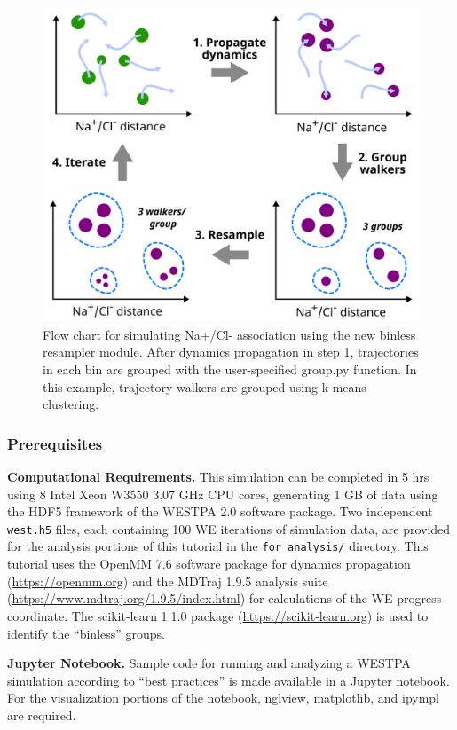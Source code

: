 \begin{figure}[t]
\centering
\includegraphics[width=\columnwidth]{figures/Figure3_binless.png}
\caption{Flow chart for simulating Na+/Cl- association using the new binless resampler module. 
After dynamics propagation in step 1, trajectories in each bin are grouped with the user-specified group.py function. 
In this example, trajectory walkers are grouped using k-means clustering.}
\label{fig:binless}
\end{figure}

\subsubsection{Prerequisites}

\textbf{Computational Requirements.} This simulation can be completed in 5 hrs using 8 Intel Xeon W3550 3.07 GHz CPU cores, generating 1 GB of data using the HDF5 framework of the WESTPA 2.0 software package. 
Two independent \verb|west.h5| files, each containing 100 WE iterations of simulation data, are provided for the analysis portions of this tutorial in the \verb|for_analysis/| directory.
This tutorial uses the OpenMM 7.6 software package for dynamics propagation ({\url{https://openmm.org}}) and the MDTraj 1.9.5 analysis suite ({\url{https://www.mdtraj.org/1.9.5/index.html}}) for calculations of the WE progress coordinate. 
The scikit-learn 1.1.0 package ({\url{https://scikit-learn.org}}) is used to identify the “binless” groups.

\textbf{Jupyter Notebook.} Sample code for running and analyzing a WESTPA simulation according to “best practices” is made available in a Jupyter notebook.
For the visualization portions of the notebook, nglview, matplotlib, and ipympl are required. 
\pagebreak

